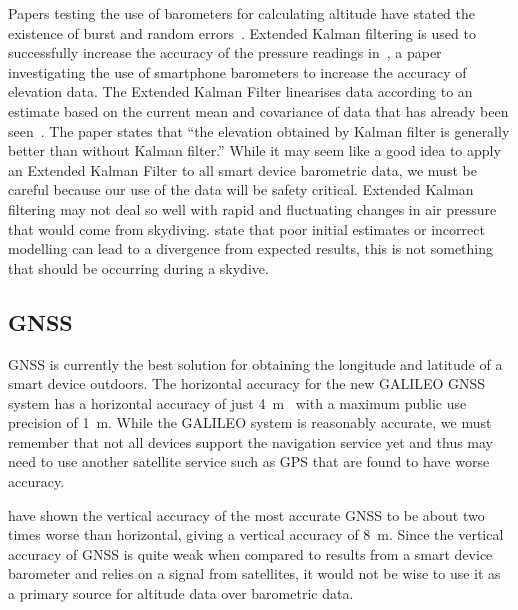 \documentclass[11pt, a4paper, twocolumn]{article}
\begin{document}
Papers testing the use of barometers for calculating altitude have stated the existence of burst and random errors~\cite{gray_integrated_1995, liu_beyond_2014}. Extended Kalman filtering is used to successfully increase the accuracy of the pressure readings in~\textcite{liu_beyond_2014}, a paper investigating the use of smartphone barometers to increase the accuracy of elevation data. The Extended Kalman Filter linearises data according to an estimate based on the current mean and covariance of data that has already been seen~\cite{julier_unscented_2004}. The paper states that ``the elevation obtained by Kalman filter is generally better than without Kalman filter.'' While it may seem like a good idea to apply an Extended Kalman Filter to all smart device barometric data, we must be careful because our use of the data will be safety critical. Extended Kalman filtering may not deal so well with rapid and fluctuating changes in air pressure that would come from skydiving. \textcite{huang_analysis_2008} state that poor initial estimates or incorrect modelling can lead to a divergence from expected results, this is not something that should be occurring during a skydive.

\subsection{GNSS}\label{sec:gps} %

GNSS is currently the best solution for obtaining the longitude and latitude of a smart device outdoors. The horizontal accuracy for the new GALILEO GNSS system has a horizontal accuracy of just \SI{4}{\metre}~\cite{kaplan_understanding_2005} with a maximum public use precision of \SI{1}{\metre}. While the GALILEO system is reasonably accurate, we must remember that not all devices support the navigation service yet and thus may need to use another satellite service such as GPS that are found to have worse accuracy.

\textcite{kaplan_understanding_2005} have shown the vertical accuracy of the most accurate GNSS to be about two times worse than horizontal, giving a vertical accuracy of \SI{8}{\metre}. Since the vertical accuracy of GNSS is quite weak when compared to results from a smart device barometer and relies on a signal from satellites, it would not be wise to use it as a primary source for altitude data over barometric data.
\end{document}
